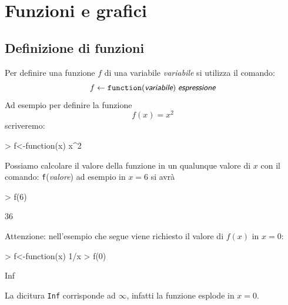 \documentclass[onecolumn,11pt]{book}
\newcommand{\varia}[1]{\textsl{\textsf{#1}}}
\newcommand{\rpr}{\textsf{R}~}
\begin{document}
 

\section{Funzioni e grafici}
\subsection{Definizione di funzioni}
Per definire una funzione $f$ di una variabile \varia{variabile}  si utilizza il comando:
$$f\leftarrow \texttt{function}(\varia{variabile})\; \varia{espressione}$$
Ad esempio per definire la funzione $$f(x)=x^2$$ scriveremo:  
\begin{Schunk}
\begin{Sinput}
> f<-function(x) x^2
\end{Sinput}
\end{Schunk}
Possiamo calcolare il valore della funzione in un qualunque valore di $x$  con il comando:
\texttt{f}(\varia{valore})
ad esempio in $x=6$ si avr\`a 
\begin{Schunk}
\begin{Sinput}
> f(6)
\end{Sinput}
\begin{Soutput}
[1] 36
\end{Soutput}
\end{Schunk}
Attenzione: nell'esempio che segue viene richiesto il valore di $f(x)$ in $x=0$:
\begin{Schunk}
\begin{Sinput}
> f<-function(x)  1/x 
> f(0)
\end{Sinput}
\begin{Soutput}
[1] Inf
\end{Soutput}
\end{Schunk}
La dicitura \texttt{Inf} corrisponde ad $\infty$, infatti la funzione esplode in $x=0$.
\end{document}

